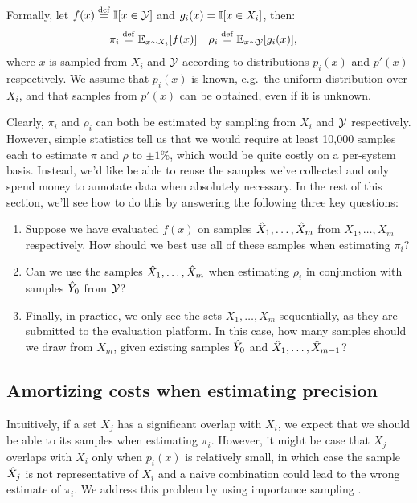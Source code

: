 Formally, let $f(x) \stackrel{\rm def}{=} \mathbb{I}[x \in \mathcal{Y}]$ and $g_i(x) = \mathbb{I}[x \in X_i]$, then:
\begin{align*}
  \pi_i  &\stackrel{\rm def}{=} \mathbb{E}_{x \sim X_i}[f(x)] &
  \rho_i &\stackrel{\rm def}{=} \mathbb{E}_{x \sim \mathcal{Y}}[g_i(x)],
\end{align*}
where $x$ is sampled from $X_i$ and $\mathcal{Y}$ according to distributions $p_i(x)$ and $p'(x)$ respectively.
We assume that $p_i(x)$ is known, e.g.\ the uniform distribution over $X_i$, and that samples from $p'(x)$ can be obtained, even if it is unknown.

Clearly, $\pi_i$ and $\rho_i$ can both be estimated by sampling from $X_i$ and $\mathcal{Y}$ respectively.
However, simple statistics tell us that we would require at least 10,000 samples each to estimate $\pi$ and $\rho$ to $\pm 1\%$, which would be quite costly on a per-system basis.
Instead, we'd like be able to reuse the samples we've collected and only spend money to annotate data when absolutely necessary.
In the rest of this section, we'll see how to do this by answering the following three key questions:
\begin{enumerate}
  \item Suppose we have evaluated $f(x)$ on samples ${\hat{X}}_1, \ldots, {\hat{X}}_m$ from $X_1, \ldots, X_m$ respectively. How should we best use all of these samples when estimating $\pi_i$?
  \item Can we use the samples ${\hat{X}}_1, \ldots, {\hat{X}}_m$ when estimating $\rho_i$ in conjunction with samples ${\hat{Y}}_0$ from $\mathcal{Y}$?
  \item Finally, in practice, we only see the sets $X_1, \ldots, X_m$ sequentially, as they are submitted to the evaluation platform. In this case, how many samples should we draw from $X_m$, given existing samples ${\hat{Y}}_0$ and ${\hat{X}}_1, \ldots, {\hat{X}}_{m-1}$?
\end{enumerate}

\subsection{Amortizing costs when estimating precision}

Intuitively, if a set $X_j$ has a significant overlap with $X_i$, we expect that we should be able to its samples when estimating $\pi_i$.
However, it might be case that $X_j$ overlaps with $X_i$ only when $p_i(x)$ is relatively small, in which case the sample ${\hat{X}}_j$ is not representative of $X_i$ and a naive combination could lead to the wrong estimate of $\pi_i$.
We address this problem by using importance sampling \citep{owen2013monte}.

